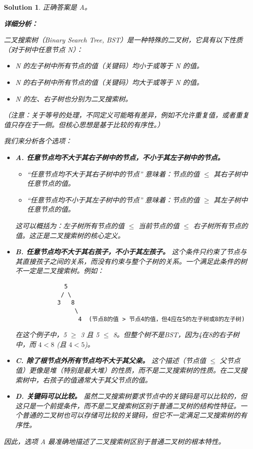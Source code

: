 \documentclass[UTF8]{report}
\newtheorem{solution}{Solution}
\theoremstyle{MyLineTheoremStyle} %
\theoremstyle{MyBlockTheoremStyle} %
\theoremstyle{MySubsubsectionStyle} %
\begin{document}
\begin{solution}
正确答案是 A。

\textbf{详细分析：}

二叉搜索树（Binary Search Tree, BST）是一种特殊的二叉树，它具有以下性质（对于树中任意节点 N）：
\begin{itemize}
    \item N 的左子树中所有节点的值（关键码）均小于或等于 N 的值。
    \item N 的右子树中所有节点的值（关键码）均大于或等于 N 的值。
    \item N 的左、右子树也分别为二叉搜索树。
\end{itemize}
（注意：关于等号的处理，不同定义可能略有差异，例如不允许重复值，或者重复值只存在于一侧。但核心思想是基于比较的有序性。）

我们来分析各个选项：
\begin{itemize}
    \item \textbf{A. 任意节点均不大于其右子树中的节点，不小于其左子树中的节点。}
        \begin{itemize}
            \item “任意节点均不大于其右子树中的节点” 意味着：节点的值 $\le$ 其右子树中任意节点的值。
            \item “任意节点均不小于其左子树中的节点” 意味着：节点的值 $\ge$ 其左子树中任意节点的值。
        \end{itemize}
        这可以概括为：左子树所有节点的值 $\le$ 当前节点的值 $\le$ 右子树所有节点的值。这正是二叉搜索树的核心定义。

    \item \textbf{B. 任意节点均不大于其右孩子，不小于其左孩子。}
        这个条件只约束了节点与其直接孩子之间的关系，而没有约束与整个子树的关系。一个满足此条件的树不一定是二叉搜索树。例如：
        \begin{verbatim}
              5
             / \
            3   8
                 \
                  4  (节点8的值 > 节点4的值，但4应在5的左子树或8的左子树)
        \end{verbatim}
        在这个例子中，5 $\ge$ 3 且 5 $\le$ 8。但整个树不是BST，因为4在8的右子树中，而 $4 < 8$ (且 $4 < 5$)。

    \item \textbf{C. 除了根节点外所有节点均不大于其父亲。}
        这个描述（节点值 $\le$ 父节点值）更像是堆（特别是最大堆）的性质，而不是二叉搜索树的性质。在二叉搜索树中，右孩子的值通常大于其父节点的值。

    \item \textbf{D. 关键码可以比较。}
        虽然二叉搜索树要求节点中的关键码是可以比较的，但这只是一个前提条件，而不是二叉搜索树区别于普通二叉树的结构性特征。一个普通的二叉树也可以存储可比较的关键码，但它不一定满足二叉搜索树的有序性。
\end{itemize}

因此，选项 A 最准确地描述了二叉搜索树区别于普通二叉树的根本特性。
\end{solution}
\end{document}
